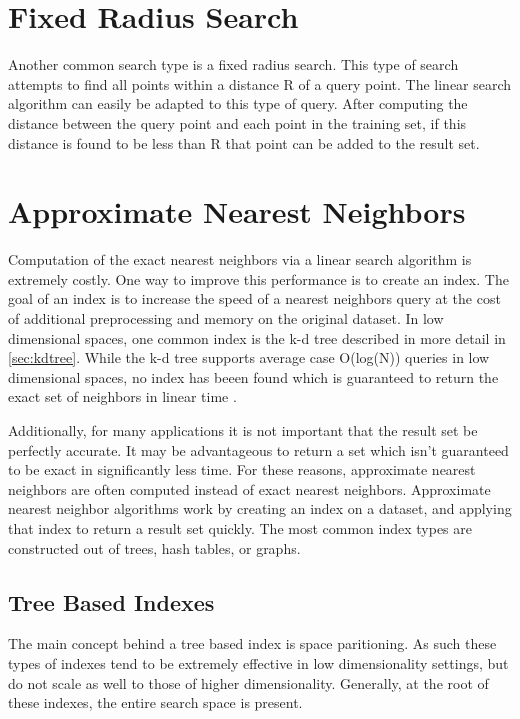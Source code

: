\section{Fixed Radius Search}

Another common search type is a fixed radius search.  This type of search attempts to find all points within a distance R of a query point.  The linear search algorithm can easily be adapted to this type of query.  After computing the distance between the query point and each point in the training set, if this distance is found to be less than R that point can be added to the result set.


\section{Approximate Nearest Neighbors}
\label{sec:ann}

Computation of the exact nearest neighbors via a linear search algorithm is extremely costly.  One way to improve this performance is to create an index.  The goal of an index is to increase the speed of a nearest neighbors query at the cost of additional preprocessing and memory on the original dataset.  In low dimensional spaces, one common index is the k-d tree described in more detail in \ref{sec:kdtree}.  While the k-d tree supports average case O(log(N)) queries in low dimensional spaces, no index has beeen found which is guaranteed to return the exact set of neighbors in linear time \citep{muja_flann_2009}.

Additionally, for many applications it is not important that the result set be perfectly accurate.  It may be advantageous to return a set which isn't guaranteed to be exact in significantly less time. For these reasons, approximate nearest neighbors are often computed instead of exact nearest neighbors.  Approximate nearest neighbor algorithms work by creating an index on a dataset, and applying that index to return a result set quickly.  The most common index types are constructed out of trees, hash tables, or graphs.

\subsection{Tree Based Indexes}

The main concept behind a tree based index is space paritioning.  As such these types of indexes tend to be extremely effective in low dimensionality settings, but do not scale as well to those of higher dimensionality.  Generally, at the root of these indexes, the entire search space is present.

